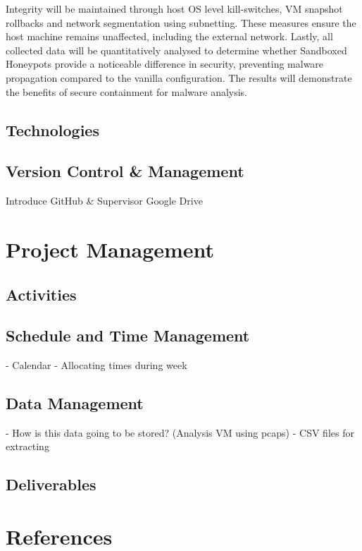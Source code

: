 \documentclass[a4paper,12pt,oneside]{book}			%
\begin{document}
Integrity will be maintained through host OS level kill-switches, VM snapshot rollbacks and network segmentation using subnetting. These measures ensure the host machine remains unaffected, including the external network. Lastly, all collected data will be quantitatively analysed to determine whether Sandboxed Honeypots provide a noticeable difference in security, preventing malware propagation compared to the vanilla configuration. The results will demonstrate the benefits of secure containment for malware analysis.


\section{Technologies}\label{sec:technologies}
\section{Version Control \&{} Management}\label{sec:versionControl}
Introduce GitHub \&{} Supervisor Google Drive


\chapter{Project Management}\label{ch:project management}
\section{Activities}\label{sec:activities}
\section{Schedule and Time Management}\label{sec:time management}
- Calendar
- Allocating times during week
\section{Data Management}\label{sec:data management}
- How is this data going to be stored? (Analysis VM using pcaps)
- CSV files for extracting
\section{Deliverables}\label{sec: deliverables}



\chapter{References}

\printbibliography
\end{document}
